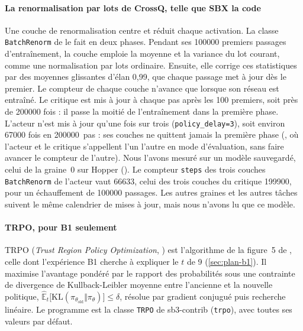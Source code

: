 \paragraph{La renormalisation par lots de CrossQ, telle que SBX la code}
Une couche de renormalisation centre et réduit chaque activation. La classe \texttt{BatchRenorm} de
 le fait en deux phases. Pendant ses \num{100000} premiers passages
d'entraînement, la couche emploie la moyenne et la variance du lot courant, comme une normalisation par lots
ordinaire. Ensuite, elle corrige ces statistiques par des moyennes glissantes d'élan 0,99, que chaque passage met à
jour dès le premier. Le compteur de chaque couche n'avance que lorsque son réseau est entraîné. Le critique est mis à jour à
chaque pas après les 100 premiers, soit près de \num{200000} fois : il passe la moitié de l'entraînement dans la
première phase. L'acteur n'est mis à jour qu'une fois sur trois (\texttt{policy\_delay=3}), soit environ
\num{67000} fois en \num{200000}~pas : ses couches ne quittent jamais la première phase
(, où l'acteur et le critique s'appellent l'un l'autre en mode d'évaluation, sans
faire avancer le compteur de l'autre). Nous l'avons mesuré sur un modèle sauvegardé, celui de la graine~0 sur
Hopper (). Le compteur \texttt{steps} des trois couches
\texttt{BatchRenorm} de l'acteur vaut \num{66633}, celui des trois couches du critique \num{199900}, pour un
échauffement de \num{100000} passages. Les autres graines et les autres tâches suivent le même calendrier de
mises à jour, mais nous n'avons lu que ce modèle.

\paragraph{TRPO, pour B1 seulement}
TRPO (\emph{Trust Region Policy Optimization}, \cite{schulman2015trpo}) est l'algorithme de la figure~5 de
\textcite{henderson2018matters}, celle dont l'expérience B1 cherche à expliquer le $t$ de 9
(\cref{sec:plan-b1}). Il maximise l'avantage pondéré par le rapport des
probabilités sous une contrainte de divergence de Kullback-Leibler moyenne entre l'ancienne et la nouvelle
politique, $\hat{\mathbb{E}}_t\bigl[\mathrm{KL}(\pi_{\theta_{\text{old}}}\Vert\pi_\theta)\bigr] \le \delta$,
résolue par gradient conjugué puis recherche linéaire. Le programme est la classe \texttt{TRPO} de sb3-contrib
(\texttt{trpo}), avec toutes ses valeurs par défaut.

